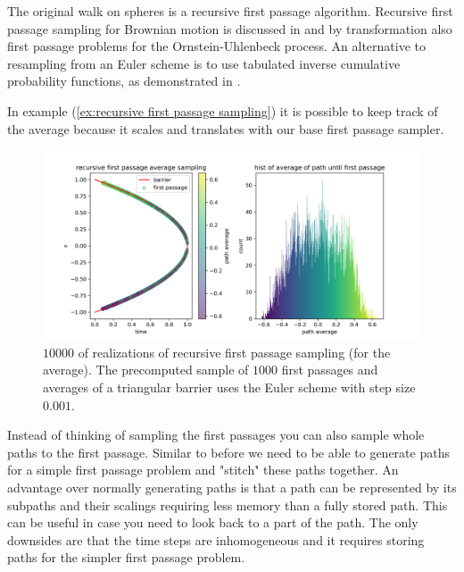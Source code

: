\documentclass[a4paper,12pt]{article}
\begin{document}
\begin{related}
    The original walk on spheres is a recursive first passage algorithm.
    Recursive first passage sampling for
    Brownian motion is discussed in \cite{herrmann_first-passage_2016}
    and by transformation also first passage problems for the
    Ornstein-Uhlenbeck process.
    An alternative to resampling from an Euler scheme is to use tabulated
    inverse cumulative probability functions,
    as demonstrated in \cite{hwang_simulationtabulation_2001}.
\end{related}



\begin{example} \label{ex:recu FP average}
    In example (\ref{ex:recursive first passage sampling}) it is possible to keep
    track of the average because it scales and translates with our base first passage sampler.

    \begin{figure}[h!]
        \centering
        \includegraphics[width=1\textwidth]{plots/recursive first passage average para.png}
        \caption{ $10000$ of realizations of recursive first passage sampling (for the average).
            The precomputed sample of $1000$ first passages and averages of a triangular barrier
            uses the Euler scheme with step size $0.001$.}
        \label{fig:recursive first passage average para}
    \end{figure}
\end{example}


\begin{technique}
    Instead of thinking of sampling the first passages you can also sample
    whole paths to the first passage. Similar to before we need to be
    able to generate paths for a simple first passage problem and "stitch"
    these paths together. An advantage over normally generating paths
    is that a path can be represented by its subpaths and their scalings
    requiring less memory than a fully stored path. This can be useful
    in case you need to look back to a part of the path.
    The only downsides are that the time steps are inhomogeneous
    and it requires storing paths for the simpler first passage problem.
\end{technique}
\end{document}

